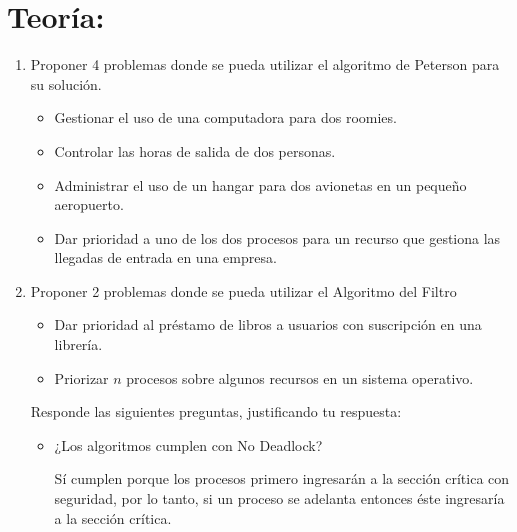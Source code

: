 \documentclass[answers]{exam}
\begin{document}

\newpage


\section{Teoría:}
\begin{enumerate}
    \item Proponer 4 problemas donde se pueda utilizar el algoritmo de Peterson para su solución.
    \begin{solution}
        \begin{itemize}
            \item Gestionar el uso de una computadora para dos roomies.
            \item Controlar las horas de salida de dos personas.
            \item Administrar el uso de un hangar para dos avionetas en un pequeño aeropuerto.
            \item Dar prioridad a uno de los dos procesos para un recurso que gestiona las llegadas de entrada en una empresa.
        \end{itemize}
    \end{solution}

    \item Proponer 2 problemas donde se pueda utilizar el Algoritmo del Filtro
    \begin{solution}
        \begin{itemize}
            \item Dar prioridad al préstamo de libros a usuarios con suscripción en una librería.
            \item Priorizar $n$ procesos sobre algunos recursos en un sistema operativo.
        \end{itemize}
    \end{solution}

    Responde las siguientes preguntas, justificando tu respuesta:
    \begin{itemize}
        \item ¿Los algoritmos cumplen con No Deadlock?
        \begin{solution}
            Sí cumplen porque los procesos primero ingresarán a la sección crítica con seguridad, por lo tanto, si un proceso se adelanta entonces éste ingresaría a la sección crítica.
        \end{solution}


\end{itemize}
\end{enumerate}
\end{document}
